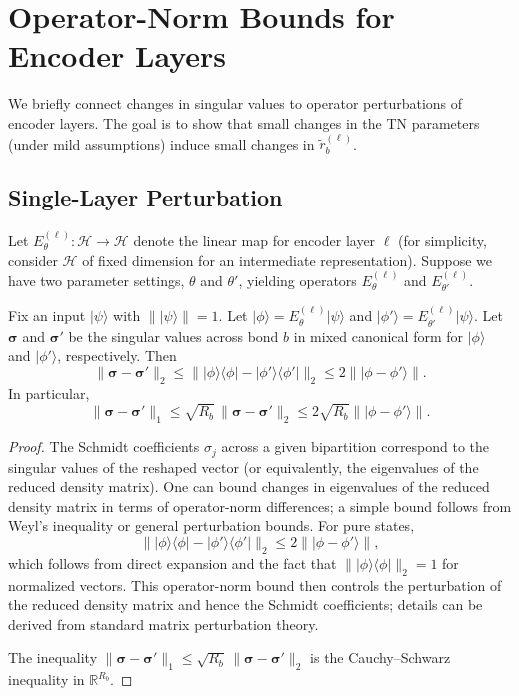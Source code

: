 \documentclass[11pt]{article}
\begin{document}
\section{Operator-Norm Bounds for Encoder Layers}

We briefly connect changes in singular values to operator perturbations of encoder layers. The goal is to show that small changes in the TN parameters (under mild assumptions) induce small changes in $\tilde{r}_b^{(\ell)}$.

\subsection{Single-Layer Perturbation}

Let $E^{(\ell)}_\theta:\mathcal{H}\to\mathcal{H}$ denote the linear map for encoder layer $\ell$ (for simplicity, consider $\mathcal{H}$ of fixed dimension for an intermediate representation). Suppose we have two parameter settings, $\theta$ and $\theta'$, yielding operators $E^{(\ell)}_\theta$ and $E^{(\ell)}_{\theta'}$.

\begin{lemma}
\label{lem:sv-perturbation}
Fix an input $\lvert \psi \rangle$ with $\|\lvert \psi \rangle\|=1$. Let $\lvert \phi \rangle = E^{(\ell)}_\theta \lvert \psi \rangle$ and $\lvert \phi' \rangle = E^{(\ell)}_{\theta'} \lvert \psi \rangle$. Let $\bm{\sigma}$ and $\bm{\sigma}'$ be the singular values across bond $b$ in mixed canonical form for $\lvert \phi \rangle$ and $\lvert \phi' \rangle$, respectively. Then
\[
\|\bm{\sigma} - \bm{\sigma}'\|_2 
\le \| \lvert \phi \rangle \langle \phi \rvert - \lvert \phi' \rangle \langle \phi' \rvert \|_2
\le 2 \|\lvert \phi - \phi' \rangle\|.
\]
In particular,
\[
\|\bm{\sigma} - \bm{\sigma}'\|_1 
\le \sqrt{R_b}\,\|\bm{\sigma} - \bm{\sigma}'\|_2
\le 2\sqrt{R_b} \|\lvert \phi - \phi' \rangle\|.
\]
\end{lemma}

\begin{proof}
The Schmidt coefficients $\sigma_j$ across a given bipartition correspond to the singular values of the reshaped vector (or equivalently, the eigenvalues of the reduced density matrix). One can bound changes in eigenvalues of the reduced density matrix in terms of operator-norm differences; a simple bound follows from Weyl's inequality or general perturbation bounds. For pure states,
\[
\| \lvert \phi \rangle \langle \phi \rvert - \lvert \phi' \rangle \langle \phi' \rvert \|_2
\le 2 \|\lvert \phi - \phi' \rangle\|,
\]
which follows from direct expansion and the fact that $\|\lvert \phi \rangle \langle \phi \rvert\|_2 = 1$ for normalized vectors. This operator-norm bound then controls the perturbation of the reduced density matrix and hence the Schmidt coefficients; details can be derived from standard matrix perturbation theory.

The inequality $\|\bm{\sigma} - \bm{\sigma}'\|_1 \le \sqrt{R_b}\,\|\bm{\sigma} - \bm{\sigma}'\|_2$ is the Cauchy--Schwarz inequality in $\mathbb{R}^{R_b}$.
\end{proof}
\end{document}

